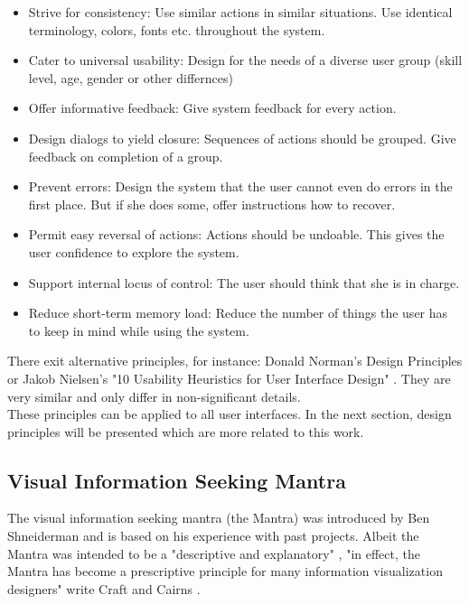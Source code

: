 \documentclass[11pt]{report}
\begin{document}
\begin{itemize}
	\item Strive for consistency: Use similar actions in similar situations. Use identical terminology, colors, fonts etc. throughout the system.	
	\item Cater to universal usability: Design for the needs of a diverse user group (skill level, age, gender or other differnces)
	\item Offer informative feedback: Give system feedback for every action.
	\item Design dialogs to yield closure: Sequences of actions should be grouped. Give feedback on completion of a group.
	\item Prevent errors: Design the system that the user cannot even do errors in the first place. But if she does some, offer instructions how to recover.
	\item Permit easy reversal of actions: Actions should be undoable. This gives the user confidence to explore the system.
	\item Support internal locus of control: The user should think that she is in charge.
	\item Reduce short-term memory load: Reduce the number of things the user has to keep in mind while using the system.
\end{itemize}

There exit alternative principles, for instance: Donald Norman's Design Principles \cite{Norman2013} or Jakob Nielsen's "10 Usability Heuristics for User Interface Design" \cite{Nielsen1995}. They are very similar and only differ in non-significant details.\\

These principles can be applied to all user interfaces. In the next section, design principles will be presented which are more related to this work.

\subsection{Visual Information Seeking Mantra}

The visual information seeking mantra (the Mantra) was introduced by Ben Shneiderman \cite{Shneiderman1996} and is based on his experience with past projects. Albeit the Mantra was intended to be a "descriptive and explanatory" \cite{Card1999}, "in effect, the Mantra has become a prescriptive principle for many information visualization designers" write Craft and Cairns \cite{Craft2005}. \\
\end{document}

